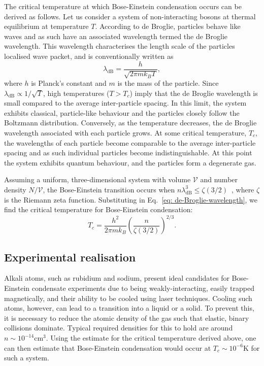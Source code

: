 The critical temperature at which Bose-Einstein condensation occurs can be
derived as follows.
Let us consider a system of non-interacting bosons at thermal equilibrium at
temperature \(T\).
According to de Broglie, particles behave like waves and as such have an
associated wavelength termed the de Broglie wavelength.
This wavelength characterises the length scale of the particles localised
wave packet, and is conventionally written as
\begin{equation}\label{eq: de-Broglie-wavelength}
    \lambda_\text{dB} = \frac{h}{\sqrt{2\pi mk_B T}},
\end{equation}
where \(h\) is Planck's constant and \(m\) is the mass of the particle.
Since \(\lambda_\text{dB} \propto 1 / \sqrt{T}\), high temperatures
(\(T > T_c\)) imply that the de Broglie wavelength is small compared to the
average inter-particle spacing.
In this limit, the system exhibits classical, particle-like behaviour and the
particles closely follow the Boltzmann distribution.
Conversely, as the temperature decreases, the de Broglie wavelength associated
with each particle grows.
At some critical temperature, \(T_c\), the wavelengths of each particle become
comparable to the average inter-particle spacing and as such individual
particles become indistinguishable.
At this point the system exhibits quantum behaviour, and the particles form a
degenerate gas.

Assuming a uniform, three-dimensional system with volume \(\mathcal{V}\) and
number density \(N/\mathcal{V}\), the Bose-Einstein transition occurs when
\(n\lambda_{\text{dB}}^3 \leq \zeta(3/2)\)~\cite{Pethick2008}, where
\(\zeta \) is the Riemann zeta function.
Substituting in Eq.~\eqref{eq: de-Broglie-wavelength}, we find the critical
temperature for Bose-Einstein condensation:
\begin{equation}
    T_c = \frac{h^2}{2\pi mk_B}{\left(\frac{n}{\zeta(3/2)}\right)}^{2/3}.
\end{equation}

\subsection{Experimental realisation}
Alkali atoms, such as rubidium and sodium, present ideal candidates
for Bose-Einstein condensate experiments due to being weakly-interacting, easily
trapped magnetically, and their ability to be cooled using laser techniques.
Cooling such atoms, however, can lead to a transition into a liquid or a solid.
To prevent this, it is necessary to reduce the atomic density of the gas such
that elastic, binary collisions dominate.
Typical required densities for this to hold are around \(n \sim 10^{-14}
\text{cm}^3\).
Using the estimate for the critical temperature derived above, one can then
estimate that Bose-Einstein condensation would occur at \(T_c \sim 10^{-6}\)K
for such a system.

